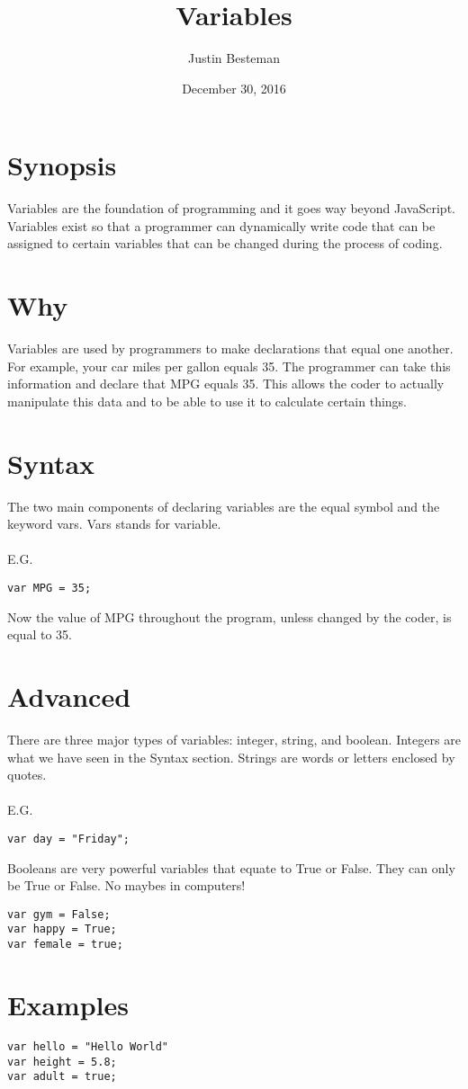 \documentclass[12pt, letterpaper]{article}
\title{Variables}
\author{Justin Besteman}
\date{December 30, 2016}
\begin{document}
\maketitle


\section*{Synopsis}

	 Variables are the foundation of programming and it goes way beyond JavaScript. Variables exist so that a programmer can dynamically write code that can be assigned to certain variables that can be changed during the process of coding. 

\section*{Why}

Variables are used by programmers to make declarations that equal one another.  For example, your car miles per gallon equals 35. The programmer can take this information and declare that MPG equals 35.  This allows the coder to actually manipulate this data and to be able to use it to calculate certain things. 

\section*{Syntax}

The two main components of declaring variables are the equal symbol and the keyword vars. Vars stands for variable. \\
\\
E.G.
\begin{lstlisting}
var MPG = 35;
\end{lstlisting}
Now the value of MPG throughout the program, unless changed by the coder, is equal to 35.

\section*{Advanced}

There are three major types of variables: integer, string, and boolean. Integers are what we have seen in the Syntax section. Strings are words or letters enclosed by quotes.\\ \\
E.G.
\begin{lstlisting}
var day = "Friday";
\end{lstlisting}
Booleans are very powerful variables that equate to True or False. They can only be True or False. No maybes in computers!

\begin{lstlisting}
var gym = False;
var happy = True;
var female = true;
\end{lstlisting}


\section*{Examples}

\begin{lstlisting}
var hello = "Hello World"
var height = 5.8;
var adult = true;
\end{lstlisting}
\end{document}
